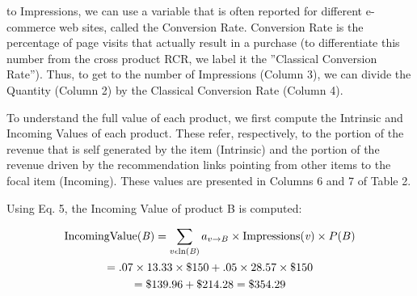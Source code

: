\begin{table}[ht]
\caption{Network Value Algorithm Example, Iteration 1}
\centering
{}
\label{table:example}
\end{table}

to Impressions, we can use a variable that is often reported for different e-commerce web sites, called the Conversion Rate. Conversion Rate is the percentage of page visits that actually result in a purchase (to differentiate this number from the cross product RCR, we label it the ”Classical Conversion Rate”). Thus, to get to the number of Impressions (Column 3), we can divide the Quantity (Column 2) by the Classical Conversion Rate (Column 4).

To understand the full value of each product, we first compute the Intrinsic and Incoming Values of each product. These refer, respectively, to the portion of the revenue that is self generated by the item (Intrinsic) and the portion of the revenue driven by the recommendation links pointing from other items to the focal item (Incoming). These values are presented in Columns 6 and 7 of Table 2.

Using Eq. 5, the Incoming Value of product B is computed:



\begin{multline}
\textrm{IncomingValue(\textit{B})} = \sum_{v \epsilon \textrm{ln(\textit{B})}} a_{v \rightarrow B} \times \textrm{Impressions(\textit{v})} \times P(B) \\ = .07 \times 13.33 \times \$150 + .05 \times 28.57 \times \$150 \\ = \$139.96 + \$214.28 = \$354.29
\end{multline}

